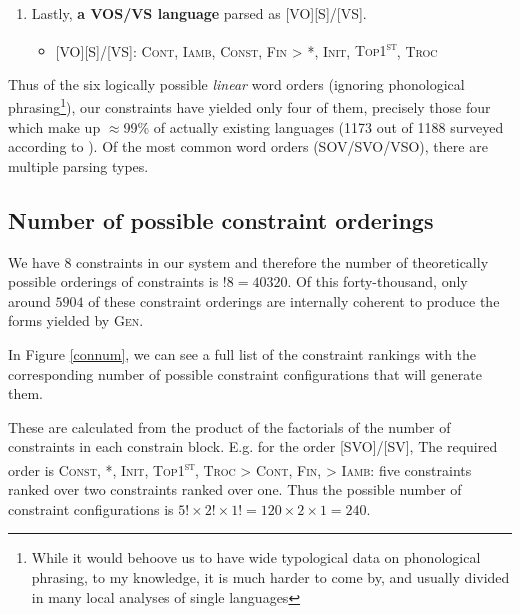 \documentclass{article}
\newcommand{\cont}{\textsc{Cont}}
\newcommand{\iamb}{\textsc{Iamb}}
\newcommand{\cons}{\textsc{Const}}
\newcommand{\topf}{\textsc{Top1\textsuperscript{st}}}
\newcommand{\nophi}{\textsc{*\textphi}}
\newcommand{\finphi}{\textsc{Fin\textphi}}
\newcommand{\initphi}{\textsc{Init\textphi}}
\newcommand{\troc}{\textsc{Troc}}
\begin{document}
\begin{enumerate}
\begin{itemize}
\item {}[VS][O]/[VS]: \cont, \iamb, \finphi, {\topf} {\textgreater} \cons, \nophi, \initphi, \troc
\item {}[VSO]/[VS]: \iamb, \cons, \nophi, \finphi, {\topf} {\textgreater} \cont, \initphi, \troc
\end{itemize}

\item Lastly, \textbf{a VOS/VS language} parsed as [VO][S]/[VS].

\begin{itemize}
\item {}[VO][S]/[VS]: \cont, \iamb, \cons, {\finphi} {\textgreater} \nophi, \initphi, \topf, \troc
\end{itemize}

\end{enumerate}

Thus of the six logically possible \emph{linear} word orders (ignoring phonological phrasing\footnote{While it would behoove us to have wide typological data on phonological phrasing, to my knowledge, it is much harder to come by, and usually divided in many local analyses of single languages}), our constraints have yielded only four of them, precisely those four which make up $\approx$99\% of actually existing languages (1173 out of 1188 surveyed according to \textcite{dryer13}).
Of the most common word orders (SOV/SVO/VSO), there are multiple parsing types.

\subsection{Number of possible constraint orderings}

We have 8 constraints in our system and therefore the number of theoretically possible orderings of constraints is $!8 = 40320$. Of this forty-thousand, only around $5904$ of these constraint orderings are internally coherent to produce the forms yielded by \textsc{Gen}.

In Figure \ref{connum}, we can see a full list of the constraint rankings with the corresponding number of possible constraint configurations that will generate them.

These are calculated from the product of the factorials of the number of constraints in each constrain block.
E.g. for the order
[SVO]/[SV],
The required order is \cons, \nophi, \initphi, \topf, {\troc} {\textgreater} \cont, {\finphi,} {\textgreater} \iamb: five constraints ranked over two constraints ranked over one. Thus the possible number of constraint configurations is $5! \times 2! \times 1! = 120 \times 2 \times 1 = 240$.
\end{document}
